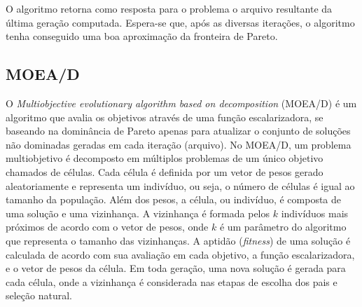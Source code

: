 O algoritmo retorna como resposta para o problema o arquivo resultante da última geração computada. Espera-se que, após as diversas iterações, o algoritmo tenha conseguido uma boa aproximação da fronteira de Pareto.



\subsection{MOEA/D}
\label{section_moead}

O \textit{Multiobjective evolutionary algorithm based on decomposition} (MOEA/D) \cite{Zhang2007} é um algoritmo que avalia os objetivos através de uma função escalarizadora, se baseando na dominância de Pareto apenas para atualizar o conjunto de soluções não dominadas geradas em cada iteração (arquivo). No MOEA/D, um problema multiobjetivo é decomposto em múltiplos problemas de um único objetivo chamados de células. Cada célula é definida por um vetor de pesos gerado aleatoriamente e representa um indivíduo, ou seja, o número de células é igual ao tamanho da população. Além dos pesos, a célula, ou indivíduo, é composta de uma solução e uma vizinhança. A vizinhança é formada pelos $k$ indivíduos mais próximos de acordo com o vetor de pesos, onde $k$ é um parâmetro do algoritmo que representa o tamanho das vizinhanças. A aptidão (\textit{fitness}) de uma solução é calculada de acordo com sua avaliação em cada objetivo, a função escalarizadora, e o vetor de pesos da célula. Em toda geração, uma nova solução é gerada para cada célula, onde a vizinhança é considerada nas etapas de escolha dos pais e seleção natural.

